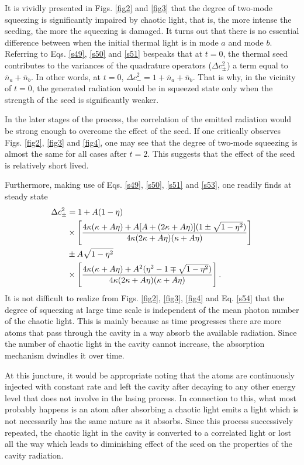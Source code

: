 \documentclass[twocolumn,showpacs,preprintnumbers,amsmath,amssymb,pra]{revtex4}
\begin{document}
It is vividly presented in Figs. \ref{fig2} and \ref{fig3} that the degree of two-mode squeezing is significantly impaired by chaotic light,  that is, the more intense the seeding, the more the squeezing is damaged. It turns out that there is no essential difference between when the initial thermal light is in mode $a$ and mode $b$. Referring to Eqs. \eqref{s49}, \eqref{s50} and \eqref{s51} bespeaks that at $t=0$, the thermal seed contributes to the variances of the quadrature operators ($\Delta c^{2}_{\pm}$) a term equal to $\bar{n}_{a}+\bar{n}_{b}$. In other words, at $t=0$, $\Delta c_{-}^{2}=1+\bar{n}_{a}+\bar{n}_{b}$. That is why, in the vicinity of $t=0$, the generated radiation would be in squeezed state only when the strength of the seed is significantly weaker. 

In the later stages of the process, the correlation of the emitted radiation would be strong enough to overcome the effect of the seed. If one critically observes Figs. \ref{fig2}, \ref{fig3} and \ref{fig4}, one may see that the degree of two-mode squeezing is almost the same for all cases after $t=2$. This suggests that the effect of the seed is relatively short lived.


Furthermore, making use of Eqs. \eqref{s49}, \eqref{s50}, \eqref{s51}  and \eqref{s53}, one readily finds at steady state
\begin{align}\label{s54}\Delta c_{\pm}^{2}&=
1+A(1-\eta)\notag\\&\times\left[\frac{4\kappa(\kappa+A\eta)+A[A+(2\kappa+A\eta)](1\pm\sqrt{1-\eta^{2}})}
{4\kappa(2\kappa+A\eta)(\kappa+A\eta)}\right]\notag\\&\pm
A\sqrt{1-\eta^{2}}\notag\\&\times\left[
\frac{4\kappa(\kappa+A\eta)+A^{2}(\eta^{2} - 1
\mp\sqrt{1-\eta^{2}})}
{4\kappa(2\kappa+A\eta)(\kappa+A\eta)}\right].\end{align}
It is not difficult to realize from Figs. \ref{fig2}, \ref{fig3}, \ref{fig4} and Eq. \eqref{s54} that the degree of squeezing at large time scale is independent of the mean photon number of the chaotic light. This is mainly because as time progresses there are more atoms that pass through the cavity in a way absorb the available radiation. Since the number of chaotic light in the cavity cannot increase, the absorption mechanism dwindles it over time. 

At this juncture, it would be appropriate noting that the atoms are continuously injected with constant rate and left the cavity after decaying to any other energy level that does not involve in the lasing process. In connection to this, what most probably happens is an atom after absorbing a chaotic light  emits a light which is not necessarily has the same nature as it absorbs. Since this process successively repeated, the chaotic light in the cavity is converted to a correlated light or lost all the way which leads to diminishing effect of the seed on the properties of the cavity radiation. 
\end{document}
